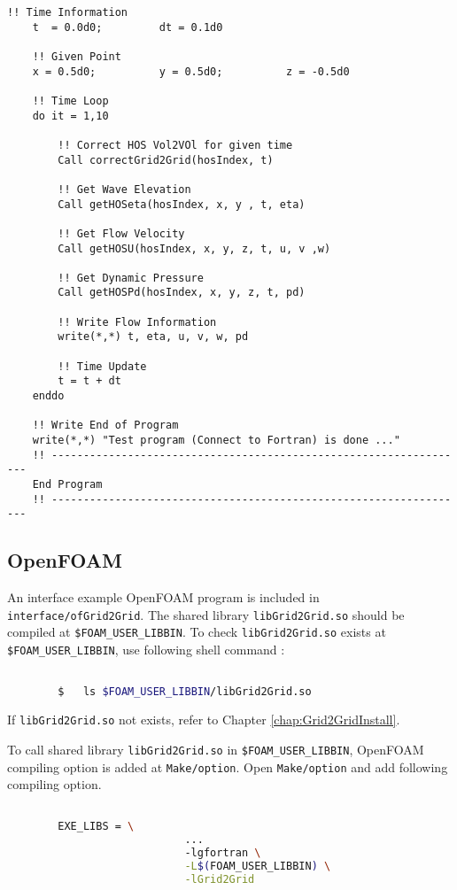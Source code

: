 \begin{lstlisting}[language={[95]Fortran}]
	!! Time Information
	t  = 0.0d0; 		dt = 0.1d0

	!! Given Point
	x = 0.5d0; 			y = 0.5d0; 			z = -0.5d0

	!! Time Loop
	do it = 1,10

		!! Correct HOS Vol2VOl for given time
		Call correctGrid2Grid(hosIndex, t)

		!! Get Wave Elevation
		Call getHOSeta(hosIndex, x, y , t, eta)

		!! Get Flow Velocity
		Call getHOSU(hosIndex, x, y, z, t, u, v ,w)

		!! Get Dynamic Pressure
		Call getHOSPd(hosIndex, x, y, z, t, pd)

		!! Write Flow Information
		write(*,*) t, eta, u, v, w, pd

		!! Time Update
		t = t + dt
	enddo

	!! Write End of Program
	write(*,*) "Test program (Connect to Fortran) is done ..."
	!! ------------------------------------------------------------------
	End Program
	!! ------------------------------------------------------------------
		\end{lstlisting}

		\pagebreak
		\subsection{OpenFOAM}

		An interface example OpenFOAM program is included in \texttt{interface/ofGrid2Grid}. The shared library \texttt{libGrid2Grid.so} should be compiled at \texttt{\$FOAM\_USER\_LIBBIN}. To check \texttt{libGrid2Grid.so} exists at \texttt{\$FOAM\_USER\_LIBBIN}, use following shell command :

		\begin{lstlisting}[language=bash]

		$	ls $FOAM_USER_LIBBIN/libGrid2Grid.so
		\end{lstlisting}

		If \texttt{libGrid2Grid.so} not exists, refer to Chapter \ref{chap:Grid2GridInstall}.

		To call shared library \texttt{libGrid2Grid.so} in \texttt{\$FOAM\_USER\_LIBBIN}, OpenFOAM compiling option is added at \texttt{Make/option}. Open \texttt{Make/option} and add following compiling option.

		\begin{lstlisting}[language=bash]

		EXE_LIBS = \
							...
							-lgfortran \
							-L$(FOAM_USER_LIBBIN) \
							-lGrid2Grid
		\end{lstlisting}

